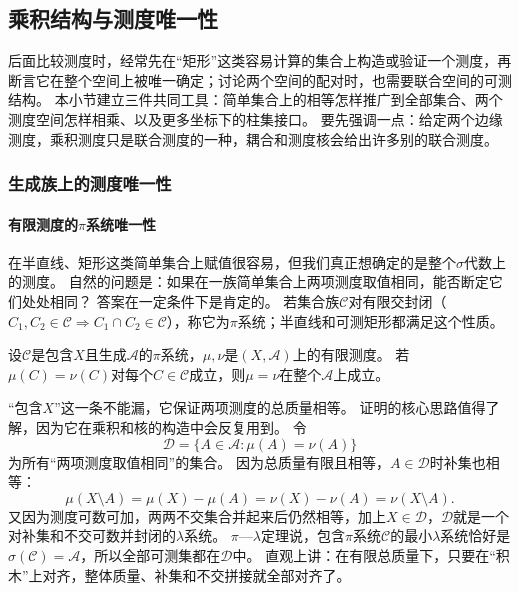 \subsection{乘积结构与测度唯一性}

后面比较测度时，经常先在“矩形”这类容易计算的集合上构造或验证一个测度，再断言它在整个空间上被唯一确定；讨论两个空间的配对时，也需要联合空间的可测结构。
本小节建立三件共同工具：简单集合上的相等怎样推广到全部集合、两个测度空间怎样相乘、以及更多坐标下的柱集接口。
要先强调一点：给定两个边缘测度，乘积测度只是联合测度的一种，耦合和测度核会给出许多别的联合测度。

\subsubsection{生成族上的测度唯一性}

\paragraph{有限测度的$\pi$系统唯一性}

在半直线、矩形这类简单集合上赋值很容易，但我们真正想确定的是整个$\sigma$代数上的测度。
自然的问题是：如果在一族简单集合上两项测度取值相同，能否断定它们处处相同？
答案在一定条件下是肯定的。
若集合族$\mathcal C$对有限交封闭（$C_1,C_2\in\mathcal C\Rightarrow C_1\cap C_2\in\mathcal C$），称它为$\pi$系统；半直线和可测矩形都满足这个性质。

\begin{theorem}[$\pi$系统上的测度唯一性]
\label{thm:measure-pi-lambda-uniqueness}
设$\mathcal C$是包含$X$且生成$\mathcal A$的$\pi$系统，$\mu,\nu$是$(X,\mathcal A)$上的有限测度。
若$\mu(C)=\nu(C)$对每个$C\in\mathcal C$成立，则$\mu=\nu$在整个$\mathcal A$上成立。
\end{theorem}

“包含$X$”这一条不能漏，它保证两项测度的总质量相等。
证明的核心思路值得了解，因为它在乘积和核的构造中会反复用到。
令
\[
 \mathcal D=\{A\in\mathcal A:\mu(A)=\nu(A)\}
\]
为所有“两项测度取值相同”的集合。
因为总质量有限且相等，$A\in\mathcal D$时补集也相等：
\[
 \mu(X\setminus A)=\mu(X)-\mu(A)=\nu(X)-\nu(A)=\nu(X\setminus A).
\]
又因为测度可数可加，两两不交集合并起来后仍然相等，加上$X\in\mathcal D$，$\mathcal D$就是一个对补集和不交可数并封闭的$\lambda$系统。
$\pi$—$\lambda$定理说，包含$\pi$系统$\mathcal C$的最小$\lambda$系统恰好是$\sigma(\mathcal C)=\mathcal A$，所以全部可测集都在$\mathcal D$中。
直观上讲：在有限总质量下，只要在“积木”上对齐，整体质量、补集和不交拼接就全部对齐了。

